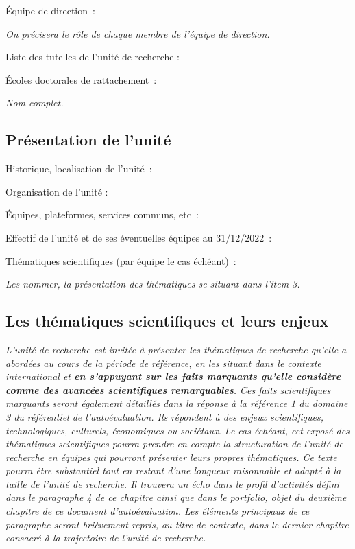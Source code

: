\documentclass[]{article}
\newcommand{\instructions}[1]{{\em \color{hceresgreen}#1}}
\begin{document}
Équipe de direction~:

\instructions{On précisera le rôle de chaque membre de l’équipe de direction.}

Liste des tutelles de l'unité de recherche :

Écoles doctorales de rattachement~:

\instructions{Nom complet.}

\subsection{Présentation de l'unité}

Historique, localisation de l'unité~:

Organisation de l'unité :

Équipes, plateformes, services communs, etc~:

Effectif de l'unité et de ses éventuelles équipes au 31/12/2022~:

Thématiques scientifiques (par équipe le cas échéant)~:

\instructions{Les nommer, la présentation des thématiques se situant dans l’item 3.}

\subsection{Les thématiques scientifiques et leurs enjeux}

\instructions{L’unité de recherche est invitée à présenter les thématiques de recherche qu’elle a abordées au cours de la période de référence, en les situant dans le contexte international et {\bf en s’appuyant sur les faits marquants qu’elle considère comme des avancées scientifiques remarquables}. Ces faits scientifiques marquants seront également détaillés dans la réponse à la référence 1 du domaine 3 du référentiel de l’autoévaluation. Ils répondent à des enjeux scientifiques, technologiques, culturels, économiques ou sociétaux. Le cas échéant, cet exposé des thématiques scientifiques pourra prendre en compte la structuration de l’unité de recherche en équipes qui pourront présenter leurs propres thématiques. Ce texte pourra être substantiel tout en restant d’une longueur raisonnable et adapté à la taille de l’unité de recherche. Il trouvera un écho dans le profil d’activités défini dans le paragraphe 4 de ce chapitre ainsi que dans le portfolio, objet du deuxième chapitre de ce document d’autoévaluation. Les éléments principaux de ce paragraphe seront brièvement repris, au titre de contexte, dans le dernier chapitre consacré à la trajectoire de l’unité de recherche.}
\end{document}
